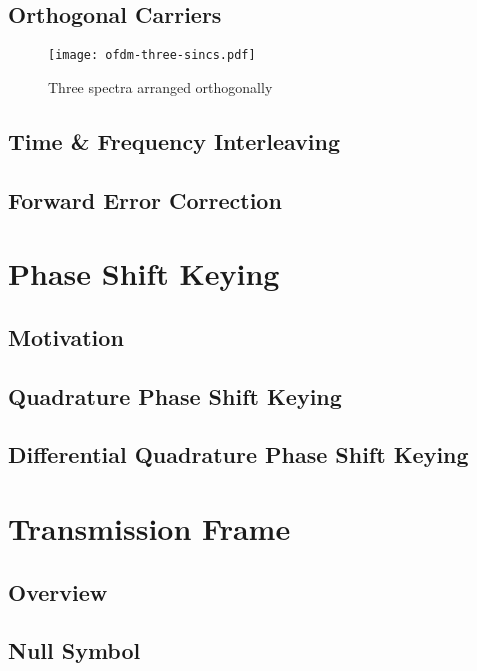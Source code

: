 \documentclass[class=report,11pt,crop=false]{standalone}
\begin{document}
\subsection{Orthogonal Carriers}


\begin{figure}
    \centering
    \texttt{[image: ofdm-three-sincs.pdf]}
    \caption{Three spectra arranged orthogonally}
    \label{fig:ofdm-three-sincs}
\end{figure}


\subsection{Time \& Frequency Interleaving}


\subsection{Forward Error Correction}



\section{Phase Shift Keying \label{sect:dab-std_psk}}
\subsection{Motivation}
\subsection{Quadrature Phase Shift Keying}
\subsection{Differential Quadrature Phase Shift Keying}


\section{Transmission Frame}


\subsection{Overview}


\subsection{Null Symbol}
\end{document}
